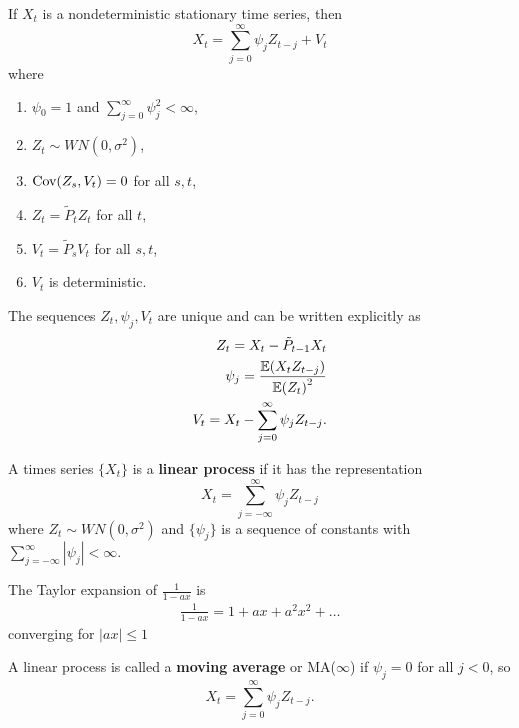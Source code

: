 \begin{defn}
  \label{defn:stationary_processes:1}
  If $X_{t}$ is a nondeterministic stationary time series, then
  \begin{equation}
    \label{eq:9}
    X_{t} = \sum_{j=0}^{\infty} \psi_{j} Z_{t-j} + V_{t}
  \end{equation} where
  \begin{enumerate}
  \item $\psi{_0} = 1$ and $\sum_{j=0}^{\infty} \psi_{j}^{2} <
    \infty$,
  \item $Z_{t} \sim WN(0, \sigma^{2})$,
  \item $\Cov{Z_{s}}{V_{t}} = 0$ for all $s, t$,
  \item $Z_{t} = \tilde P_{t} Z_{t}$ for all $t$,
  \item $V_{t} = \tilde P_{s} V_{t}$ for all $s, t$,
  \item $V_{t}$ is deterministic.
  \end{enumerate}
  The sequences $Z_{t}, \psi_{j}, V_{t}$ are unique and can be written
  explicitly as
  \begin{align}
    \label{eq:9}
    Z_{t} = X_{t} - \tilde P_{t-1} X_{t} \\
    \psi_{j} = \frac{\E{X_{t} Z_{t-j}}}{\E{Z_{t}}^{2}} \\
    V_{t} = X_{t} - \sum_{j=0}^{\infty} \psi_{j} Z_{t-j}.
  \end{align}
\end{defn}

\begin{defn}
  \label{defn:stationary_processes:1}
  A times series $\{ X_{t} \}$ is a \textbf{linear process} if it has
  the representation
  \begin{equation}
    \label{eq:9}
    X_{t} = \sum_{j=-\infty}^{\infty} \psi_{j} Z_{t-j}
  \end{equation}
  where $Z_{t} \sim WN(0, \sigma^{2})$ and $\{ \psi_{j} \}$ is a
  sequence of constants with $\sum_{j=-\infty}^{\infty} |\psi_{j}| <
  \infty$.
\end{defn}

\begin{thm}
  The Taylor expansion of $\frac{1}{1-ax}$ is
  \begin{align}
    \label{eq:12}
    \frac{1}{1-ax} = 1 + ax + a^{2} x^{2} + \dots
  \end{align} converging for $|ax| \leq 1$
\end{thm}

A linear process is called a \textbf{moving average} or MA($\infty$)
if $\psi_{j} = 0$ for all $j < 0$, so
\begin{equation}
  \label{eq:9}
  X_{t} = \sum_{j=0}^{\infty} \psi_{j} Z_{t-j}.
\end{equation}

